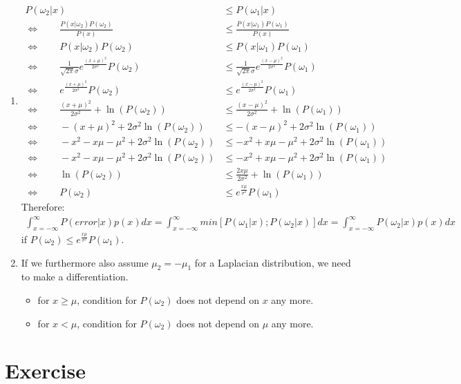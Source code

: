 \documentclass[a4paper]{article}
\begin{document}
		\begin{enumerate}[label={(\alph*)}]
		\item
			\begin{align*}
			P(\omega_2|x) &\leq P(\omega_1|x)\\
			\Leftrightarrow \qquad \frac{P(x|\omega_2)P(\omega_2)}{P(x)} &\leq \frac{P(x|\omega_1)P(\omega_1)}{P(x)}\\
			\Leftrightarrow \qquad P(x|\omega_2)P(\omega_2)&\leq P(x|\omega_1)P(\omega_1)\\
			\Leftrightarrow \qquad \frac{1}{\sqrt{2\pi}\sigma}e^{ \displaystyle\frac{(x+\mu)^2}{2\sigma^2}}P(\omega_2) &\leq \frac{1}{\sqrt{2\pi}\sigma}e^{\displaystyle \frac{(x-\mu)^2}{2\sigma^2}}P(\omega_1)\\
			\Leftrightarrow \qquad e^{\displaystyle\frac{(x+\mu)^2}{2\sigma^2}}P(\omega_2) &\leq e^{\displaystyle \frac{(x-\mu)^2}{2\sigma^2}}P(\omega_1)\\
			\Leftrightarrow \qquad \frac{(x+\mu)^2}{2\sigma^2} + \ln(P(\omega_2)) &\leq \frac{(x-\mu)^2}{2\sigma^2} + \ln(P(\omega_1))\\
			\Leftrightarrow \qquad -(x+\mu)^2 + 2\sigma^2\ln(P(\omega_2)) &\leq -(x-\mu)^2 + 2\sigma^2\ln(P(\omega_1))\\
			\Leftrightarrow \qquad -x^2 -x\mu -\mu^2 + 2\sigma^2\ln(P(\omega_2)) &\leq -x^2+x\mu -\mu^2 + 2\sigma^2\ln(P(\omega_1))\\
			\Leftrightarrow \qquad -x^2 -x\mu -\mu^2 + 2\sigma^2\ln(P(\omega_2)) &\leq -x^2+x\mu -\mu^2 + 2\sigma^2\ln(P(\omega_1))\\
			\Leftrightarrow \qquad \ln(P(\omega_2)) &\leq \frac{2x\mu}{2\sigma^2}+\ln(P(\omega_1))\\
			\Leftrightarrow \qquad P(\omega_2) &\leq e^{\displaystyle \frac{x\mu}{\sigma^2}}P(\omega_1)
			\end{align*}
			Therefore:\\
			\begin{align*}
				\int_{x=-\infty}^\infty P(error|x)p(x)dx=\int_{x=-\infty}^\infty min[P(\omega_1|x); P(\omega_2|x)]dx=\int_{x=-\infty}^\infty P(\omega_2|x)p(x)dx
			\end{align*}
			if $P(\omega_2) \leq e^{\frac{x\mu}{\sigma^2}}P(\omega_1)$.
			\item If we furthermore also assume $\mu_2 = -\mu_1$ for a Laplacian distribution, we need to make a differentiation.
			\begin{itemize}
				\item for $x\geq \mu$, condition for $P(\omega_2)$ does not depend on $x$ any more.
				\item for $x < \mu$, condition for $P(\omega_2)$ does not depend on $\mu$ any more.
			\end{itemize}
		\end{enumerate}
	\section{Exercise}
\end{document}
